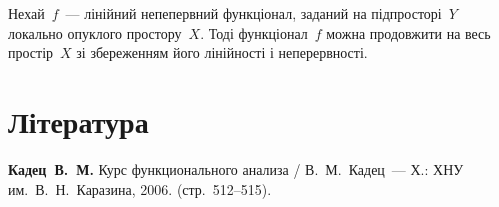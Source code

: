 \begin{theorem}
    \label{th:locally-convex-hahn-banach-theorem}
    Нехай~$f$~--- лінійний непепервний функціонал, заданий на підпросторі~$Y$ локально опуклого простору~$X$. Тоді функціонал~$f$ можна продовжити на весь простір~$X$ зі збереженням його лінійності і неперервності.
\end{theorem}

\section{Література}

\begin{enumerate}[label={[\arabic*]}]
\item \textbf{Кадец~В.~М.}
Курс функционального анализа /
В.~М.~Кадец~---
Х.: ХНУ им.~В.~Н.~Каразина, 2006. (стр.~512--515).
\end{enumerate}
